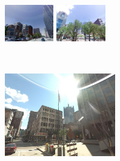 \begin{minipage}{0.75\linewidth}
\begin{minipage}{\linewidth}
        \colorbox{myRed}{\includegraphics[height=16mm]{imgs/ex2/FV3.jpg}}
        \colorbox{myRed}{\includegraphics[height=16mm]{imgs/ex2/FV4.jpg}}
    \end{minipage} 
\end{minipage}
\vspace{3mm}
\\
\begin{minipage}{0.34\linewidth}
    \centering
    \vspace{0mm}
    \includegraphics[height=36mm]{imgs/ex3/query.jpg}
\end{minipage}
